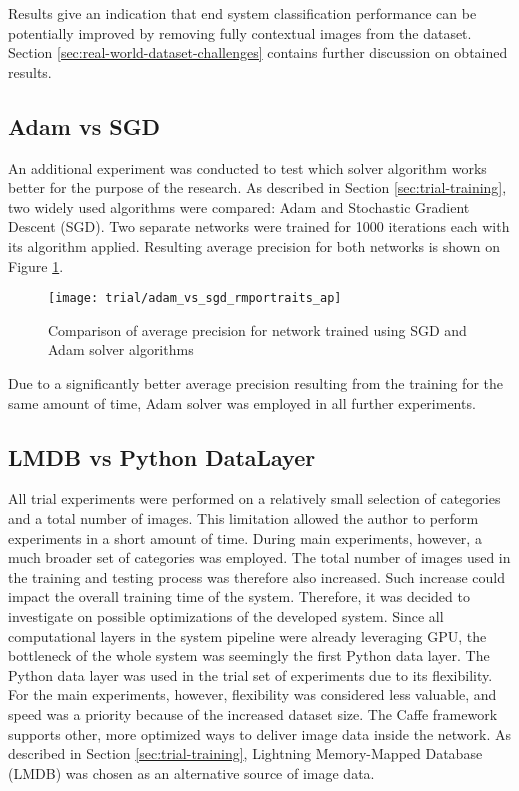     
    Results give an indication that end system classification performance can be potentially improved by removing fully contextual images from the dataset. Section \ref{sec:real-world-dataset-challenges} contains further discussion on obtained results.

    
\subsection{Adam vs SGD}
    An additional experiment was conducted to test which solver algorithm works better for the purpose of the research. As described in Section \ref{sec:trial-training}, two widely used algorithms were compared: Adam and Stochastic Gradient Descent (SGD). Two separate networks were trained for 1000 iterations each with its algorithm applied. Resulting average precision for both networks is shown on Figure \ref{fig:trial-sgd-vs-adam}.

    \begin{figure}[H]
        \centering
        \texttt{[image: trial/adam\_vs\_sgd\_rmportraits\_ap]}
        \caption[Trial experiment. Average precision for Adam vs SGD solvers]{Comparison of average precision for network trained using SGD and Adam solver algorithms}
        \label{fig:trial-sgd-vs-adam}
    \end{figure}
    
    Due to a significantly better average precision resulting from the training for the same amount of time, Adam solver was employed in all further experiments.
    
    
\subsection{LMDB vs Python DataLayer}
    All trial experiments were performed on a relatively small selection of categories and a total number of images. This limitation allowed the author to perform experiments in a short amount of time. During main experiments, however, a much broader set of categories was employed. The total number of images used in the training and testing process was therefore also increased. Such increase could impact the overall training time of the system. Therefore, it was decided to investigate on possible optimizations of the developed system. Since all computational layers in the system pipeline were already leveraging GPU, the bottleneck of the whole system was seemingly the first Python data layer. The Python data layer was used in the trial set of experiments due to its flexibility. For the main experiments, however, flexibility was considered less valuable, and speed was a priority because of the increased dataset size. The Caffe framework supports other, more optimized ways to deliver image data inside the network. As described in Section \ref{sec:trial-training}, Lightning Memory-Mapped Database (LMDB) was chosen as an alternative source of image data.
    
